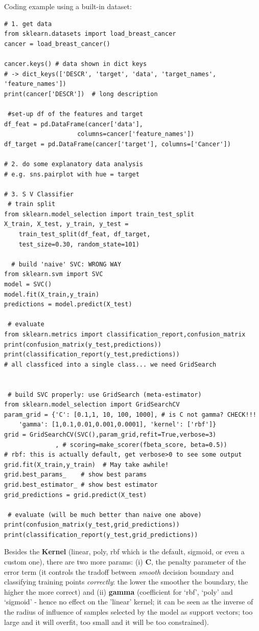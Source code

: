 \documentclass[11pt]{article}
\begin{document}
Coding example using a built-in dataset:
\begin{lstlisting}
# 1. get data
from sklearn.datasets import load_breast_cancer
cancer = load_breast_cancer()

cancer.keys() # data shown in dict keys
# -> dict_keys(['DESCR', 'target', 'data', 'target_names', 'feature_names'])
print(cancer['DESCR'])  # long description
 
 #set-up df of the features and target
df_feat = pd.DataFrame(cancer['data'], 
					columns=cancer['feature_names'])
df_target = pd.DataFrame(cancer['target'], columns=['Cancer'])

# 2. do some explanatory data analysis
# e.g. sns.pairplot with hue = target

# 3. S V Classifier
 # train split
from sklearn.model_selection import train_test_split
X_train, X_test, y_train, y_test = 
	train_test_split(df_feat, df_target, 
	test_size=0.30, random_state=101)
	
  # build 'naive' SVC: WRONG WAY
from sklearn.svm import SVC
model = SVC()
model.fit(X_train,y_train)
predictions = model.predict(X_test)

 # evaluate
from sklearn.metrics import classification_report,confusion_matrix
print(confusion_matrix(y_test,predictions))
print(classification_report(y_test,predictions))
# all classficed into a single class... we need GridSearch

 
 # build SVC properly: use GridSearch (meta-estimator)
from sklearn.model_selection import GridSearchCV
param_grid = {'C': [0.1,1, 10, 100, 1000], # is C not gamma? CHECK!!!
	'gamma': [1,0.1,0.01,0.001,0.0001], 'kernel': ['rbf']}  
grid = GridSearchCV(SVC(),param_grid,refit=True,verbose=3)	
              , # scoring=make_scorer(fbeta_score, beta=0.5))
# rbf: this is actually default, get verbose>0 to see some output
grid.fit(X_train,y_train)  # May take awhile!
grid.best_params_    # show best params
grid.best_estimator_ # show best estimator
grid_predictions = grid.predict(X_test)

 # evaluate (will be much better than naive one above)
print(confusion_matrix(y_test,grid_predictions))
print(classification_report(y_test,grid_predictions))
\end{lstlisting}
Besides the \textbf{Kernel} (linear, poly, rbf which is the default, sigmoid, or even a custom one), there are two more params: (i) \textbf{C}, the penalty parameter of the error term (it controls the tradoff between \textit{smooth} decision boundary and classifying training points \textit{correctly}: the lower the smoother the boundary, the higher the more correct) and (ii) \textbf{gamma} (coefficient for ‘rbf’, ‘poly’ and ‘sigmoid’ - hence no effect on the 'linear' kernel; it can be seen as the inverse of the radius of influence of samples selected by the model as support vectors; too large and it will overfit, too small and it will be too constrained).
\end{document}
